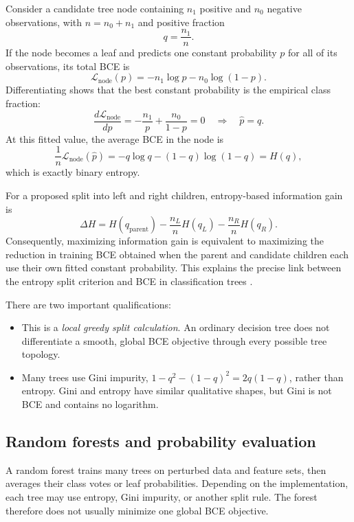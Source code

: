 \documentclass[11pt]{article}
\theoremstyle{definition}
\begin{document}
Consider a candidate tree node containing $n_1$ positive and $n_0$ negative observations, with $n=n_0+n_1$ and positive fraction
\[
q=\frac{n_1}{n}.
\]
If the node becomes a leaf and predicts one constant probability $p$ for all of its observations, its total BCE is
\begin{equation}
\mathcal L_{\mathrm{node}}(p)
=-n_1\log p-n_0\log(1-p).
\label{eq:node-bce}
\end{equation}
Differentiating shows that the best constant probability is the empirical class fraction:
\[
\frac{d\mathcal L_{\mathrm{node}}}{dp}
=-\frac{n_1}{p}+\frac{n_0}{1-p}=0
\quad\Longrightarrow\quad
\widehat p=q.
\]
At this fitted value, the average BCE in the node is
\begin{equation}
\frac{1}{n}\mathcal L_{\mathrm{node}}(\widehat p)
=-q\log q-(1-q)\log(1-q)
=H(q),
\label{eq:node-entropy-bce}
\end{equation}
which is exactly binary entropy.

For a proposed split into left and right children, entropy-based information gain is
\begin{equation}
\Delta H
=H(q_{\mathrm{parent}})
-\frac{n_L}{n}H(q_L)
-\frac{n_R}{n}H(q_R).
\label{eq:tree-information-gain}
\end{equation}
Consequently, maximizing information gain is equivalent to maximizing the reduction in training BCE obtained when the parent and candidate children each use their own fitted constant probability. This explains the precise link between the entropy split criterion and BCE in classification trees \cite{breiman1984}.

There are two important qualifications:
\begin{itemize}
  \item This is a \emph{local greedy split calculation}. An ordinary decision tree does not differentiate a smooth, global BCE objective through every possible tree topology.
  \item Many trees use Gini impurity, $1-q^2-(1-q)^2=2q(1-q)$, rather than entropy. Gini and entropy have similar qualitative shapes, but Gini is not BCE and contains no logarithm.
\end{itemize}

\subsection{Random forests and probability evaluation}

A random forest trains many trees on perturbed data and feature sets, then averages their class votes or leaf probabilities. Depending on the implementation, each tree may use entropy, Gini impurity, or another split rule. The forest therefore does not usually minimize one global BCE objective.
\end{document}
